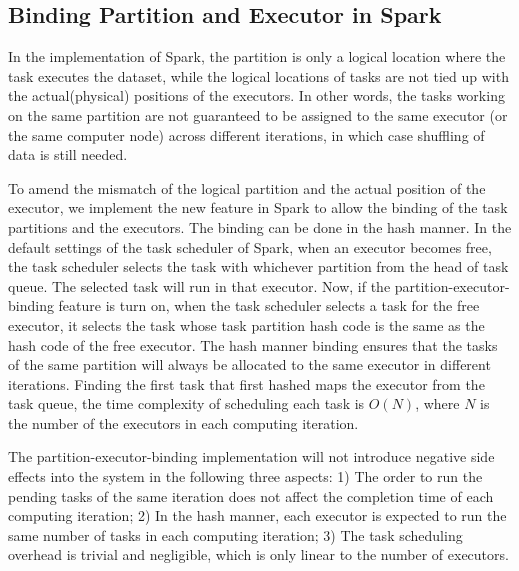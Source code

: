 \documentclass[10pt,journal,compsoc]{IEEEtran}
\begin{document}
\subsection{Binding Partition and Executor in Spark}
In the implementation of Spark, the partition is only a logical location where the task executes the dataset, while the logical locations of tasks are not tied up with the actual(physical) positions of the executors. 
In other words, %
the tasks working on the same partition are not guaranteed to be assigned to the same executor (or the same computer node) across different iterations, in which case shuffling of data is still needed. 

To amend the mismatch of the logical partition and the actual position of the executor, we implement the new feature in Spark to allow the binding of the task partitions and the executors. 
The binding can be done in the hash manner. 
In the default settings of the task scheduler of Spark, when an executor becomes free, the task scheduler selects the task with whichever partition from the head of task queue. The selected task will run in that executor. 
Now, if the partition-executor-binding feature is turn on, when the task scheduler selects a task for the free executor, 
it selects the task whose task partition hash code is the same as the hash code of the free executor. 
The hash manner binding ensures that the tasks of the same partition will always be allocated to the same executor in different iterations. 
Finding the first task that first hashed maps the executor from the task queue, 
the time complexity of scheduling each task is $O(N)$, 
where $N$ is the number of the executors in each computing iteration. 

The partition-executor-binding implementation will not introduce negative side effects into the system in the following three aspects: 1)  The order to run the pending tasks of the same iteration does not affect the completion time of each computing iteration; 2) In the hash manner, each executor is expected to run the same number of tasks in each computing iteration;
3) The task scheduling overhead is trivial and negligible, which is only linear to the number of executors. 
\end{document}
